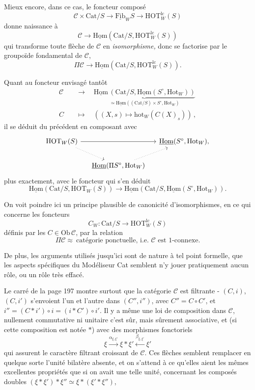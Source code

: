 \documentclass[11pt]{article}
\newcommand{\printedpage}[1]{\marginpar{\footnotesize p.~#1}}
\newcommand{\msp}[1]{\marginpar{\footnotesize [#1]}}
\newcommand{\Hom}{\underline{\mathrm{Hom}}}
\newcommand{\Fib}{\underline{\mathrm{Fib}}}
\newcommand{\Cat}{\mathrm{Cat}}
\newcommand{\HOT}{\mathrm{HOT}}
\newcommand{\Hot}{\mathrm{Hot}}
\newcommand{\hot}{\mathrm{hot}}
\begin{document}
Mieux encore, dans ce cas, le foncteur composé
\[
\mathcal{C} \times \Cat/S \longrightarrow \Fib_W S \longrightarrow \HOT^{\mathrm{lc}}_W(S)
\]
donne naissance à
\[
\mathcal{C} \longrightarrow \Hom(\Cat/S, \HOT^{\mathrm{lc}}_W(S))
\]
qui transforme toute flèche de $\mathcal{C}$ en \textit{isomorphisme,} donc se factorise par le groupoïde fondamental de $\mathcal{C}$,
\[
\Pi\mathcal{C} \longrightarrow \Hom(\Cat/S, \HOT^{\mathrm{lc}}_W(S)).
\]

\msp{page 200}Quant au foncteur envisagé tantôt
\[
\begin{aligned}
\mathcal{C} &\quad\longrightarrow\quad \underbrace{\Hom\,(\Cat/S, \Hom(S^\circ, \Hot_W))}_{\simeq\Hom((\Cat/S)\times S^\circ, \Hot_W)} \\
C &\quad\longmapsto\quad ((X,s) \longmapsto \hot_W(C(X)_s))\,,
\end{aligned}
\]
il se déduit du précédent en composant avec
\[
\begin{tikzcd}[column sep=small]
\HOT_W(S) \arrow[rr] \arrow[dr, dotted] & & \Hom(S^\circ, \Hot_W), \\
 & \Hom(\Pi S^\circ, \Hot_W) \arrow[ur, dotted] &
\end{tikzcd}
\]
plus exactement, avec le foncteur qui s'en déduit
\[
\Hom(\Cat/S, \HOT_W(S)) \longrightarrow \Hom(\Cat/S, \Hom(S^\circ, \Hot_W)).
\]

On voit poindre ici un principe plausible de canonicité d'isomorphismes, en ce qui concerne les foncteurs
\[
C_W : \Cat/S \longrightarrow \HOT^{\mathrm{lc}}_W(S)
\]
définis par les $C \in \mathrm{Ob}\,\mathcal{C}$, par la relation
\[
\Pi\mathcal{C} \approx \ \text{catégorie ponctuelle, i.e. } \mathcal{C} \text{ est 1-connexe.}
\]

De plus, les arguments utilisés jusqu'ici sont de nature à tel point formelle, que les aspects spécifiques du Modéliseur Cat
\printedpage{132}
\msp{page 201}semblent n'y jouer pratiquement aucun rôle, ou un rôle très effacé.

Le carré de la page 197 montre surtout que la catégorie $\mathcal{C}$ est filtrante - $(C,i)$, $(C,i')$ s'envoient l'un et l'autre dans $(C'',i'')$, avec $C'' = C \circ C'$, et $i'' = (C * i') \circ i = (i * C') \circ i'$. Il y a même une loi de composition dans $\mathcal{C}$, nullement commutative ni unitaire c'est sûr, mais sûrement associative, et (si cette composition est notée $*$) avec des morphismes fonctoriels %
\[
\xi \xrightarrow{\alpha_{\xi,\xi'}} \xi * \xi' \xleftarrow{\beta_{\xi,\xi'}} \xi'
\]
qui assurent le caractère filtrant croissant de $\mathcal{C}$. Ces flèches semblent remplacer en quelque sorte l'unité bilatère absente, et on s'attend à ce qu'elles aient les mêmes excellentes propriétés que si on avait une telle unité, concernant les composés doubles $(\xi * \xi') * \xi'' \simeq \xi * (\xi' * \xi'')$,
\end{document}
